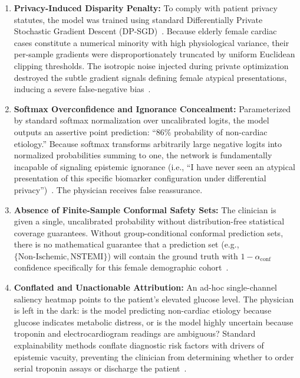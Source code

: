 \documentclass[3p,12pt]{elsarticle}
\theoremstyle{plain}
\theoremstyle{definition}
\begin{document}
\begin{enumerate}
    \item \textbf{Privacy-Induced Disparity Penalty:} To comply with patient privacy statutes, the model was trained using standard Differentially Private Stochastic Gradient Descent (DP-SGD)~\cite{abadi2016deep}. Because elderly female cardiac cases constitute a numerical minority with high physiological variance, their per-sample gradients were disproportionately truncated by uniform Euclidean clipping thresholds. The isotropic noise injected during private optimization destroyed the subtle gradient signals defining female atypical presentations, inducing a severe false-negative bias~\cite{bagdasaryan2019differential,suriyakumar2021chasing}.
    \item \textbf{Softmax Overconfidence and Ignorance Concealment:} Parameterized by standard softmax normalization over uncalibrated logits, the model outputs an assertive point prediction: ``86\% probability of non-cardiac etiology.'' Because softmax transforms arbitrarily large negative logits into normalized probabilities summing to one, the network is fundamentally incapable of signaling epistemic ignorance (i.e., ``I have never seen an atypical presentation of this specific biomarker configuration under differential privacy'')~\cite{sensoy2018evidential,bengs2022pitfalls}. The physician receives false reassurance.
    \item \textbf{Absence of Finite-Sample Conformal Safety Sets:} The clinician is given a single, uncalibrated probability without distribution-free statistical coverage guarantees. Without group-conditional conformal prediction sets, there is no mathematical guarantee that a prediction set (e.g., $\{\text{Non-Ischemic}, \text{NSTEMI}\}$) will contain the ground truth with $1-\alpha_{\text{conf}}$ confidence specifically for this female demographic cohort~\cite{angelopoulos2021gentle,vovk2005algorithmic}.
    \item \textbf{Conflated and Unactionable Attribution:} An ad-hoc single-channel saliency heatmap points to the patient's elevated glucose level. The physician is left in the dark: is the model predicting non-cardiac etiology because glucose indicates metabolic distress, or is the model highly uncertain because troponin and electrocardiogram readings are ambiguous? Standard explainability methods conflate diagnostic risk factors with drivers of epistemic vacuity, preventing the clinician from determining whether to order serial troponin assays or discharge the patient~\cite{antoran2021clue,hullermeier2021aleatoric}.
\end{enumerate}
\end{document}
